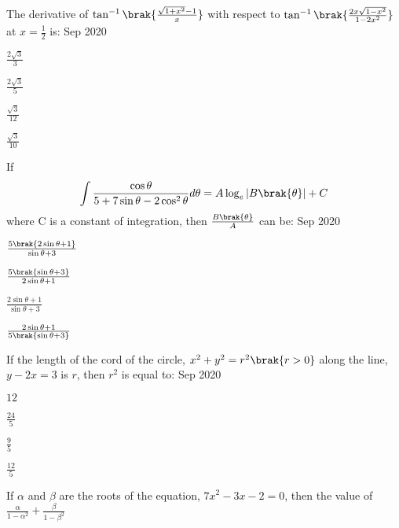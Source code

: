      \item The derivative of $\tan^{-1}\brak{\frac{\sqrt{1+x^{2}}-1}{x}}$ with respect to $\tan^{-1}\brak{\frac{2x\sqrt{1-x^{2}}}{1-2x^{2}}}$ at $x=\frac{1}{2}$ is:
	     \hfill{Sep 2020}
     \begin{enumerate}
     \begin{multicols}{4}
     \item $\frac{ 2 \sqrt{3}}{3}$
     \item $\frac{2\sqrt{3}}{5}$
     \item $\frac{\sqrt{3}}{12}$
     \item $\frac{\sqrt{3}}{10}$
     \end{multicols}
      \end{enumerate}
      \item If 
	      \begin{align}
		      \int \frac{\cos\theta}{5+7\sin\theta-2\cos^{2}\theta}d\theta= A\log_{e}|B\brak{\theta}|+C
	      \end{align}
	      where C is a constant of integration, then $\frac{B\brak{\theta}}{A}$ can be:
	      \hfill{Sep 2020}
      \begin{enumerate}
      \begin{multicols}{4}
      \item $\frac{5\brak{2\sin\theta+1}}{\sin\theta+3}$
      \item $\frac{5\brak{\sin\theta+3}}{2\sin\theta+1}$
       \item $\frac{2\sin\theta+1}{\sin\theta+3}$
       \item $\frac{2\sin\theta+1}{5\brak{\sin\theta+3}}$
      \end{multicols}
      \end{enumerate}
      \item If the length of the cord of the circle, $x^{2}+y^{2}=r^{2}\brak{r>0}$ along the line, $y-2x=3$ is $r$, then $r^{2}$ is equal to:
	      \hfill{Sep 2020}
      \begin{enumerate}
      \begin{multicols}{4}
      \item $12$
      \item $\frac{24}{5}$
      \item $\frac{9}{5}$
      \item $\frac{12}{5}$
      \end{multicols}
      \end{enumerate}
      \item If $\alpha$ and $\beta$ are the roots of the equation, $7x^{2}-3x-2=0$, then the value of$\frac{\alpha}{1-\alpha^{2}} +\frac{\beta}{1-\beta^{2}}$
